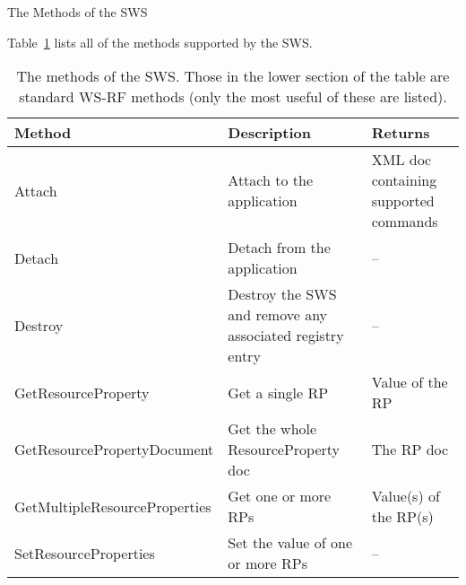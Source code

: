 \documentclass[a4paper]{article}
\begin{document}
\begin{section}{The Methods of the SWS}

Table~\ref{table:SWSmethods} lists all of the methods supported by the
SWS.

\begin{table}
\begin{center}
\begin{tabular}{l|p{4cm}|p{4cm}}
\hline\hline
Method & Description & Returns\\
\hline
Attach & Attach to the application & XML doc containing supported commands\\
Detach & Detach from the application & --\\
\hline
Destroy & Destroy the SWS and remove any associated registry entry & --\\
GetResourceProperty & Get a single RP & Value of the RP \\
GetResourcePropertyDocument & Get the whole ResourceProperty doc & The RP doc\\
GetMultipleResourceProperties & Get one or more RPs & Value(s) of the RP(s) \\
SetResourceProperties & Set the value of one or more RPs & -- \\
\hline\hline
\end{tabular}
\end{center}
\caption{The methods of the SWS.  Those in the lower section of the table 
are standard WS-RF methods (only the most useful of these are listed).}
\label{table:SWSmethods}
\end{table}

\end{section}
\end{document}
